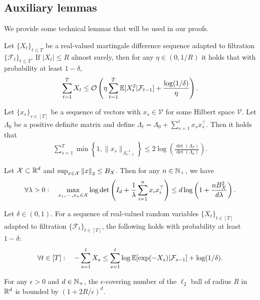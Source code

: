 \subsection{Auxiliary lemmas}\label{app:lemmas}

We provide some technical lemmas that will be used in our proofs.

\begin{lm}
    \label{lm:Freedman}
    Let $\{X_t\}_{t\leq T}$ be a real-valued martingale difference sequence adapted to filtration $\{\mathcal{F}_t\}_{t\leq T}$. If $|X_t| \leq R$ almost surely, then for any $\eta \in (0,1/R)$ it holds that with probability at least $1-\delta$,
    $$\sum_{t=1}^T X_t \leq {\mathcal{O}}\left(\eta\sum_{t=1}^T \mathbb{E}[X_t^2|\mathcal{F}_{t-1}] + \frac{\log(1/\delta)}{\eta}\right).$$
\end{lm}


\begin{lm}\label{lm:potential}
    Let $\{x_s\}_{s\in[T]}$ be a sequence of vectors with $x_s \in \mathcal{V}$ for some Hilbert space $\mathcal{V}$. Let $\Lambda_0$ be a positive definite matrix and define $\Lambda_t = \Lambda_0 + \sum_{s=1}^t x_sx_s^\top$. Then it holds that
    \begin{align*}
        \sum_{s=1}^T \min\left\{1,\|x_s\|_{\Lambda_{s-1}^{-1}}\right\} \leq 2\log\left(\frac{\det(\Lambda_{T})}{\det(\Lambda_0)}\right).
    \end{align*}
\end{lm}

\begin{lm}\label{lm:information_gain}
    Let ${\mathcal{X}}\subset \mathbb{R}^d$ and $\sup_{x\in{\mathcal{X}}}\left\| x \right\|_2\leq B_X$. Then for any $n\in{\mathbb N}_+$, we have
    \begin{align*}
        \forall \lambda>0:\quad\max_{x_1,\cdots,x_n\in{\mathcal{X}}}\log \det\left(I_d+\frac{1}{\lambda}\sum_{i=1}^n x_i x_i^\top\right)\leq d\log\left(1+\frac{nB_X^2}{d\lambda}\right).
    \end{align*}
\end{lm}

\begin{lm}\label{lm:martingale_exp}
Let $\delta \in (0,1)$. For a sequence of real-valued random variables $\{X_t\}_{t\in[T]}$ adapted to filtration $\{\mathcal{F}_t\}_{t\in[T]}$, the following holds with probability at least $1-\delta$:
    \begin{align*}
        \forall t\in[T]: \quad -\sum_{s=1}^t X_s \leq \sum_{s=1}^t\log\mathbb{E}[\exp(-X_s)|\mathcal{F}_{s-1}] + \log(1/\delta).
    \end{align*}
\end{lm}

\begin{lm}
    \label{lm:covering}
    For any $\epsilon>0$ and $d\in{\mathbb N}_+$, the $\epsilon$-covering number of the $\ell_2$ ball of radius $R$ in $\mathbb{R}^d$ is bounded by $(1+2R/\epsilon)^d$.
\end{lm}
